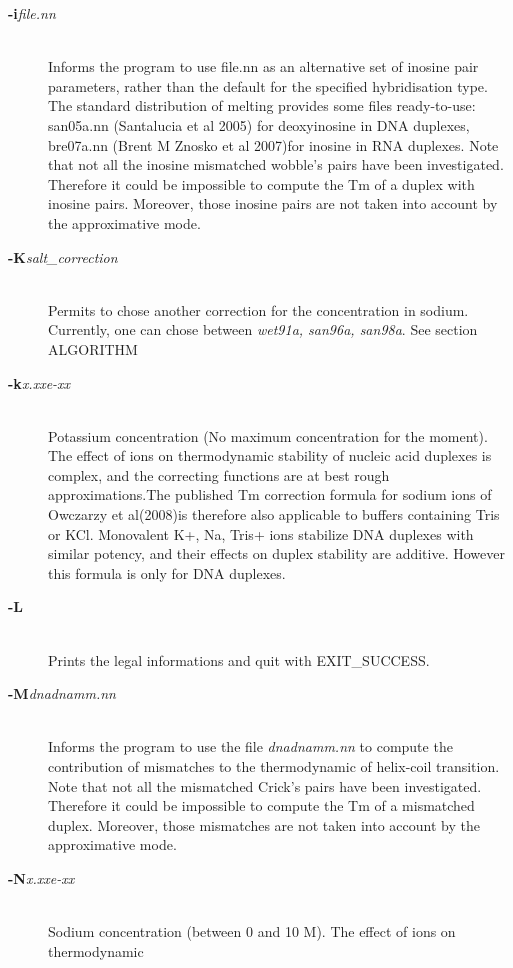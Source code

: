 \documentclass{article}
\begin{document}
\begin{description}
\item [\textbf{-i}\textit{file.nn}] \mbox{}\\ 
Informs  the  program to use file.nn as an alternative set  of  inosine pair 
 parameters, rather than  the  default  for the specified hybridisation type. 
 The standard distribution of melting provides some  files ready-to-use:  san05a.nn 
(Santalucia et al 2005) for deoxyinosine in DNA duplexes, bre07a.nn (Brent M Znosko 
 et al 2007)for inosine in RNA duplexes. Note  that  not all the inosine mismatched 
 wobble's pairs have been investigated. Therefore it could be impossible to  compute
 the Tm of a duplex with inosine pairs. Moreover, those inosine pairs are not taken 
 into account by the  approximative mode.
\item [\textbf{-K}\textit{salt\_correction}]\mbox{}\\ 
Permits to chose another correction for the concentration in sodium. Currently, 
one can chose between \textit{wet91a, san96a, san98a}.  See section ALGORITHM 
\item [\textbf{-k}\textit{x.xxe-xx}]\mbox{}\\ 
 Potassium  concentration  (No maximum concentration for the moment). The effect of ions 
 on  thermodynamic  stability  of nucleic  acid duplexes is complex, and the correcting 
 functions are  at  best rough  approximations.The published  Tm  correction formula for 
 sodium ions of Owczarzy et al(2008)is therefore also applicable to buffers containing Tris or
 KCl. Monovalent K+, Na, Tris+ ions  stabilize  DNA duplexes 
 with similar potency, and their effects on duplex stability are additive. However this formula 
 is only for DNA duplexes.
\item [\textbf{-L}]\mbox{}\\ Prints the legal informations and quit
  with EXIT\_SUCCESS. 
\item [\textbf{-M}\textit{dnadnamm.nn}]\mbox{}\\ 
Informs the program to use the file  \textit{dnadnamm.nn} to compute
the contribution of mismatches to the thermodynamic of helix-coil
transition. Note that not all the mismatched Crick's pairs have been
investigated. Therefore it could be impossible to compute the Tm of a
mismatched duplex. Moreover, those mismatches are not taken into
account by the approximative mode. 
\item [\textbf{-N}\textit{x.xxe-xx}  ]\mbox{}\\
  Sodium concentration (between 0 and 10 M). The effect of ions on thermodynamic

\end{description}
\end{document}

